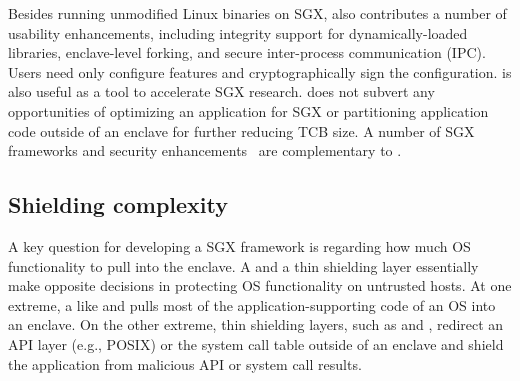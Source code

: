 Besides running unmodified Linux binaries on SGX, \graphenesgx{} also contributes a number of usability enhancements,
including integrity support for dynamically-loaded libraries, enclave-level forking, and secure inter-process communication (IPC).
Users need only configure features and cryptographically sign the configuration.
\graphenesgx{} is also useful as a tool to accelerate SGX research.
\graphenesgx{} does not subvert
any opportunities of optimizing an application for SGX or partitioning application code outside of an enclave for further reducing TCB size.
A number of SGX frameworks and security enhancements~\cite{orenbach17eleos,kuvaiskii17sgxbound,shih2017t-sgx,seo2017sgx-shield} are complementary to \graphenesgx{}. 



\subsection{Shielding complexity}


A key question for developing a SGX framework is regarding how much OS functionality to pull into the enclave.
A \libos{} and a thin shielding layer essentially make opposite decisions
in protecting OS functionality on untrusted hosts.
At one extreme, a \libos{} like \graphenesgx{} and \haven{} pulls most
of the application-supporting code of an OS into an enclave.
On the other extreme, thin shielding layers, such as \scone{} and \panoply{}, redirect
an API layer (e.g., POSIX) or the system call table
outside of an enclave and shield the application from malicious API or system call results.



